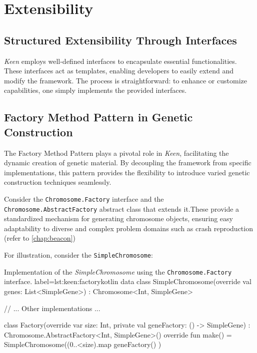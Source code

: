\section{Extensibility}
\label{sec:keen:extensibility}

    \subsection{Structured Extensibility Through Interfaces}
        \textit{Keen} employs well-defined interfaces to encapsulate essential functionalities. These interfaces act as 
        templates, enabling developers to easily extend and modify the framework. The process is straightforward: to 
        enhance or customize capabilities, one simply implements the provided interfaces.

    \subsection{Factory Method Pattern in Genetic Construction}
        The Factory Method Pattern plays a pivotal role in \textit{Keen}, facilitating the dynamic creation of genetic 
        material. By decoupling the framework from specific implementations, this pattern provides the flexibility to 
        introduce varied genetic construction techniques seamlessly.

        Consider the \texttt{Chromosome.Factory} interface and the \texttt{Chromosome.AbstractFactory} abstract class that extends it.These 
        provide a standardized mechanism for generating chromosome objects, ensuring
        easy adaptability to diverse and complex problem domains such as crash
        reproduction (refer to \vref{chap:beacon})

        For illustration, consider the \texttt{SimpleChromosome}:

        \begin{code}{
        Implementation of the \textit{SimpleChromosome} using the 
        \texttt{Chromosome.Factory} interface.
        }{label=lst:keen:factory}{kotlin}
        data class SimpleChromosome(override val genes: List<SimpleGene>) :
            Chromosome<Int, SimpleGene> {
            // ... Other implementations ...

            class Factory(override var size: Int, private val geneFactory: () -> SimpleGene) :
                Chromosome.AbstractFactory<Int, SimpleGene>() {
                override fun make() = SimpleChromosome((0..<size).map { geneFactory() })
            }
        }
        \end{code}

